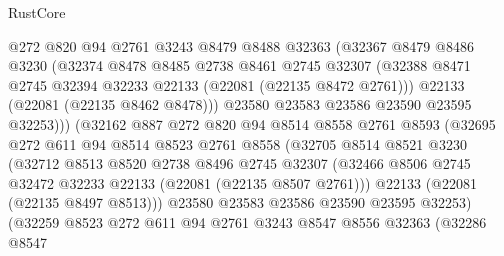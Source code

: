 \begin{lexlean}{RustCore}
\begin{coremodule}
                        @272
                        @820
                        @94
                        @2761
                        @3243
                        @8479
                        @8488
                        @32363
                        (@32367
                          @8479
                          @8486
                          @3230
                          (@32374
                            @8478
                            @8485
                            @2738
                            @8461
                            @2745
                            @32307
                            (@32388 @8471 @2745 @32394 @32233 @22133 (@22081 (@22135 @8472 @2761)))
                            @22133
                            (@22081 (@22135 @8462 @8478)))
                          @23580
                          @23583
                          @23586
                          @23590
                          @23595
                          @32253)))
                    (@32162
                      @887
                      @272
                      @820
                      @94
                      @8514
                      @8558
                      @2761
                      @8593
                      (@32695
                        @272
                        @611
                        @94
                        @8514
                        @8523
                        @2761
                        @8558
                        (@32705
                          @8514
                          @8521
                          @3230
                          (@32712
                            @8513
                            @8520
                            @2738
                            @8496
                            @2745
                            @32307
                            (@32466 @8506 @2745 @32472 @32233 @22133 (@22081 (@22135 @8507 @2761)))
                            @22133
                            (@22081 (@22135 @8497 @8513)))
                          @23580
                          @23583
                          @23586
                          @23590
                          @23595
                          @32253)
                        (@32259
                          @8523
                          @272
                          @611
                          @94
                          @2761
                          @3243
                          @8547
                          @8556
                          @32363
                          (@32286
                            @8547

\end{coremodule}
\end{lexlean}
